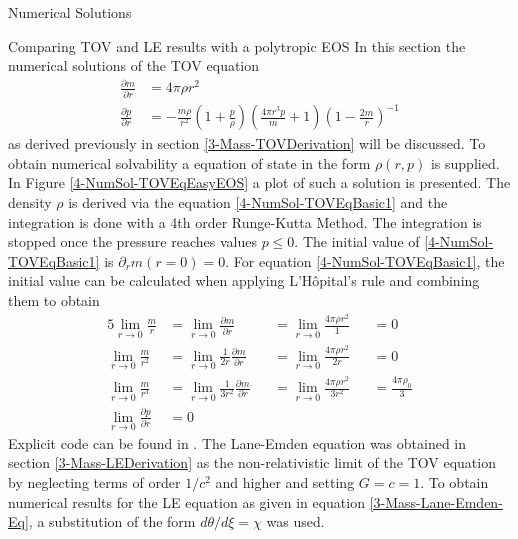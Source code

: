 \begin{section}{Numerical Solutions}
\begin{subsection}{Comparing TOV and LE results with a polytropic EOS}
In this section the numerical solutions of the \ac{TOV} equation
\begin{align}
	\frac{\partial m}{\partial r} &= 4\pi\rho r^2\label{4-NumSol-TOVEqBasic1}\\
	\frac{\partial p}{\partial r} &=-\frac{m\rho}{r^2}\left(1+\frac{p}{\rho}\right)\left(\frac{4\pi r^3p}{m}+1\right)\left(1-\frac{2m}{r}\right)^{-1}
	\label{4-NumSol-TOVEqBasic2}
\end{align}
as derived previously in section \ref{3-Mass-TOVDerivation} will be discussed. To obtain numerical solvability a equation of state in the form $\rho(r,p)$ is supplied. 
In Figure \ref{4-NumSol-TOVEqEasyEOS} a plot of such a solution is presented.
The density $\rho$ is derived via the equation \eqref{4-NumSol-TOVEqBasic1} and the integration is done with a 4th order Runge-Kutta Method.
The integration is stopped once the pressure reaches values $p\leq0$. The initial value of \eqref{4-NumSol-TOVEqBasic1} is $\partial_r m(r=0)=0$. For equation \eqref{4-NumSol-TOVEqBasic1}, the initial value can be calculated when applying L'Hôpital's rule and combining them to obtain
\begin{alignat}{5}
	\lim\limits_{r\rightarrow0}\frac{m}{r} &= \lim\limits_{r\rightarrow0}\frac{\partial m}{\partial r} &&=\lim\limits_{r\rightarrow0}\frac{4\pi\rho r^2}{1} &&= 0\\
	\lim\limits_{r\rightarrow0}\frac{m}{r^2} &= \lim\limits_{r\rightarrow0}\frac{1}{2r}\frac{\partial m}{\partial r}  &&= \lim\limits_{r\rightarrow0}\frac{4\pi\rho r^2}{2r} &&= 0\\
	\lim\limits_{r\rightarrow0}\frac{m}{r^3} &= \lim\limits_{r\rightarrow0}\frac{1}{3r^2}\frac{\partial m}{\partial r} &&=\lim\limits_{r\rightarrow0}\frac{4\pi\rho r^2}{3r^2} &&= \frac{4\pi\rho_0}{3}\\
	\lim\limits_{r\rightarrow0}\frac{\partial p}{\partial r} &= 0
\end{alignat}
Explicit code can be found in \cite{pleyerGithubRepositoryJonas2021}. The Lane-Emden equation was obtained in section \ref{3-Mass-LEDerivation} as the non-relativistic limit of the \ac{TOV} equation by neglecting terms of order $1/c^2$ and higher and setting $G=c=1$. To obtain numerical results for the \ac{LE} equation as given in equation \eqref{3-Mass-Lane-Emden-Eq}, a substitution of the form $d\theta/d\xi=\chi$ was used.

\end{subsection}
\end{section}
